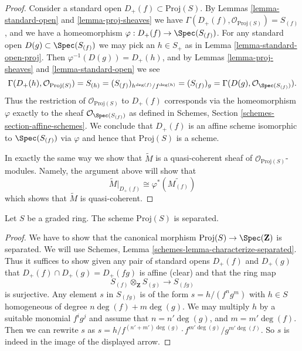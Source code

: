 \begin{proof}
Consider a standard open $D_{+}(f) \subset \text{Proj}(S)$.
By Lemmas \ref{lemma-standard-open} and \ref{lemma-proj-sheaves}
we have $\Gamma(D_{+}(f), \mathcal{O}_{\text{Proj}(S)}) = S_{(f)}$, and
we have a homeomorphism $\varphi : D_{+}(f) \to \Spec(S_{(f)})$.
For any standard open $D(g) \subset \Spec(S_{(f)})$ we may
pick an $h \in S_{+}$ as in Lemma \ref{lemma-standard-open-proj}.
Then $\varphi^{-1}(D(g)) = D_{+}(h)$, and by
Lemmas \ref{lemma-proj-sheaves} and \ref{lemma-standard-open} we see
$$
\Gamma(D_{+}(h), \mathcal{O}_{\text{Proj}(S)})
=
S_{(h)}
=
(S_{(f)})_{h^{\deg(f)}/f^{\deg(h)}}
=
(S_{(f)})_g
=
\Gamma(D(g), \mathcal{O}_{\Spec(S_{(f)})}).
$$
Thus the restriction of $\mathcal{O}_{\text{Proj}(S)}$ to
$D_{+}(f)$ corresponds via the homeomorphism $\varphi$
exactly to the sheaf $\mathcal{O}_{\Spec(S_{(f)})}$
as defined in Schemes, Section \ref{schemes-section-affine-schemes}.
We conclude that $D_{+}(f)$ is an affine scheme isomorphic to
$\Spec(S_{(f)})$ via $\varphi$ and
hence that $\text{Proj}(S)$ is a scheme.

\medskip\noindent
In exactly the same way we show that $\widetilde M$ is a
quasi-coherent sheaf of $\mathcal{O}_{\text{Proj}(S)}$-modules.
Namely, the argument above will show that
$$
\widetilde M|_{D_{+}(f)} \cong \varphi^*\left(\widetilde{M_{(f)}}\right)
$$
which shows that $\widetilde M$ is quasi-coherent.
\end{proof}

\begin{lemma}
\label{lemma-proj-separated}
Let $S$ be a graded ring.
The scheme $\text{Proj}(S)$ is separated.
\end{lemma}

\begin{proof}
We have to show that the canonical morphism
$\text{Proj}(S) \to \Spec(\mathbf{Z})$
is separated.
We will use Schemes, Lemma \ref{schemes-lemma-characterize-separated}.
Thus it suffices to show given any pair of standard opens
$D_{+}(f)$ and $D_{+}(g)$ that $D_{+}(f) \cap D_{+}(g) = D_{+}(fg)$
is affine (clear) and that the ring map
$$
S_{(f)} \otimes_{\mathbf{Z}} S_{(g)} \longrightarrow S_{(fg)}
$$
is surjective. Any element $s$ in $S_{(fg)}$ is of
the form $s = h/(f^ng^m)$ with $h \in S$ homogeneous of degree
$n\deg(f) + m\deg(g)$. We may multiply $h$ by a suitable
monomial $f^ig^j$ and assume that $n = n' \deg(g)$, and
$m = m' \deg(f)$. Then we can rewrite $s$ as
$s = h/f^{(n' + m')\deg(g)} \cdot f^{m'\deg(g)}/g^{m'\deg(f)}$.
So $s$ is indeed in the image of the displayed arrow.
\end{proof}

